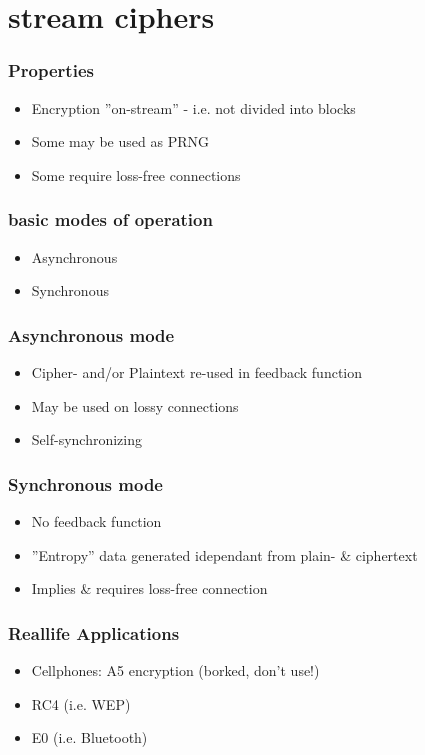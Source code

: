 
\section{stream ciphers}
\begin{frame}
\frametitle{Properties}
	\begin{itemize}
		\item<2-> Encryption ''on-stream'' - i.e. not divided into blocks
		\item<3-> Some may be used as PRNG
		\item<4-> Some require loss-free connections
	\end{itemize}
\end{frame}
\begin{frame}
\frametitle{basic modes of operation}
	\begin{itemize}
		\item<2-> Asynchronous
		\item<3-> Synchronous
	\end{itemize}
\end{frame}

\begin{frame}
\frametitle{Asynchronous mode}
	\begin{itemize}
		\item<2-> Cipher- and/or Plaintext re-used in feedback function
		\item<3-> May be used on lossy connections
		\item<4-> Self-synchronizing
	\end{itemize}
\end{frame}


\begin{frame}
\frametitle{Synchronous mode}
	\begin{itemize}
		\item<2-> No feedback function
		\item<3-> ''Entropy'' data generated idependant from plain- \& ciphertext
		\item<4-> Implies \& requires loss-free connection
	\end{itemize}
\end{frame}

\begin{frame}
\frametitle{Reallife Applications}
	\begin{itemize}
		\item<2-> Cellphones: A5 encryption (borked, don't use!)
		\item<3-> RC4 (i.e. WEP)
		\item<4-> E0 (i.e. Bluetooth)
	\end{itemize}
\end{frame}


